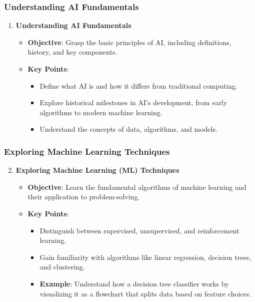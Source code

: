 \documentclass[aspectratio=169]{beamer}
\begin{document}
\begin{frame}[fragile]
    \frametitle{Understanding AI Fundamentals}
    \begin{enumerate}
        \item \textbf{Understanding AI Fundamentals}
        \begin{itemize}
            \item \textbf{Objective}: Grasp the basic principles of AI, including definitions, history, and key components.
            \item \textbf{Key Points}:
            \begin{itemize}
                \item Define what AI is and how it differs from traditional computing.
                \item Explore historical milestones in AI's development, from early algorithms to modern machine learning.
                \item Understand the concepts of data, algorithms, and models.
            \end{itemize}
        \end{itemize}
    \end{enumerate}
\end{frame}

\begin{frame}[fragile]
    \frametitle{Exploring Machine Learning Techniques}
    \begin{enumerate}
        \setcounter{enumi}{1}
        \item \textbf{Exploring Machine Learning (ML) Techniques}
        \begin{itemize}
            \item \textbf{Objective}: Learn the fundamental algorithms of machine learning and their application to problem-solving.
            \item \textbf{Key Points}:
            \begin{itemize}
                \item Distinguish between supervised, unsupervised, and reinforcement learning.
                \item Gain familiarity with algorithms like linear regression, decision trees, and clustering.
                \item \textbf{Example}: Understand how a decision tree classifier works by visualizing it as a flowchart that splits data based on feature choices.
            \end{itemize}
        \end{itemize}
    \end{enumerate}
\end{frame}
\end{document}
